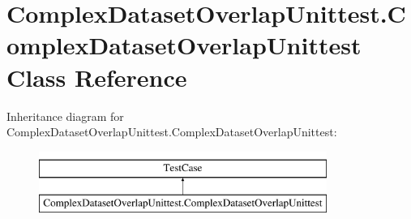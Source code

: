 \hypertarget{classComplexDatasetOverlapUnittest_1_1ComplexDatasetOverlapUnittest}{\section{Complex\-Dataset\-Overlap\-Unittest.\-Complex\-Dataset\-Overlap\-Unittest Class Reference}
\label{classComplexDatasetOverlapUnittest_1_1ComplexDatasetOverlapUnittest}
}
Inheritance diagram for Complex\-Dataset\-Overlap\-Unittest.\-Complex\-Dataset\-Overlap\-Unittest\-:\begin{figure}[H]
\begin{center}
\leavevmode
\includegraphics[height=2.000000cm]{classComplexDatasetOverlapUnittest_1_1ComplexDatasetOverlapUnittest}
\end{center}
\end{figure}
